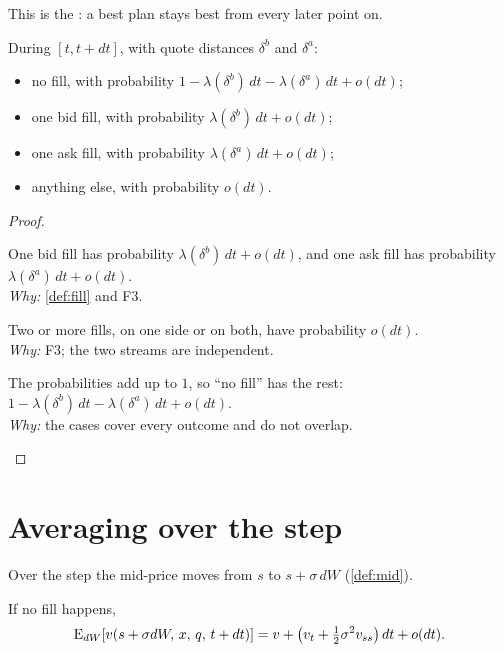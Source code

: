 This is the : a best plan stays best from every later point on.

\begin{result}
\label{res:cases}
During $[t,t+dt]$, with quote distances $\delta^b$ and $\delta^a$:
\begin{itemize}
  \item no fill, with probability $1-\lambda(\delta^b)\,dt-\lambda(\delta^a)\,dt+o(dt)$;
  \item one bid fill, with probability $\lambda(\delta^b)\,dt+o(dt)$;
  \item one ask fill, with probability $\lambda(\delta^a)\,dt+o(dt)$;
  \item anything else, with probability $o(dt)$.
\end{itemize}
\end{result}

\begin{proof}
\begin{steps}
  \item One bid fill has probability $\lambda(\delta^b)\,dt+o(dt)$, and one ask fill has probability $\lambda(\delta^a)\,dt+o(dt)$.
  \\ \emph{Why:} \cref{def:fill} and F3.
  \item Two or more fills, on one side or on both, have probability $o(dt)$.
  \\ \emph{Why:} F3; the two streams are independent.
  \item The probabilities add up to $1$, so ``no fill'' has the rest: $1-\lambda(\delta^b)\,dt-\lambda(\delta^a)\,dt+o(dt)$.
  \\ \emph{Why:} the cases cover every outcome and do not overlap.
\end{steps}
\end{proof}

\section{Averaging over the step}

Over the step the mid-price moves from $s$ to $s+\sigma\,dW$ (\cref{def:mid}).

\begin{result}[No fill]
\label{res:nofill}
If no fill happens,
\[
  \operatorname{E}_{dW}\!\left[v(s+\sigma dW,\,x,\,q,\,t+dt)\right]=v+\big(v_t+\tfrac12\sigma^2v_{ss}\big)\,dt+o(dt).
\]
\end{result}


